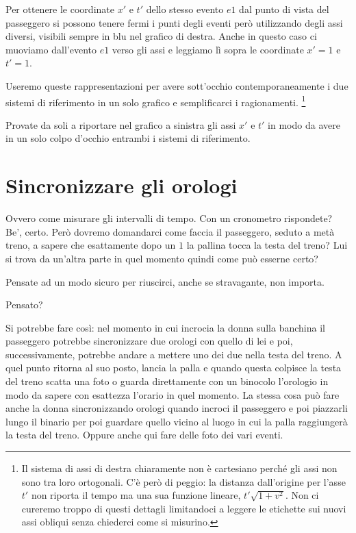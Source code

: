 Per ottenere le coordinate $x'$ e $t'$ dello stesso evento $e1$ dal punto di vista del passeggero si possono tenere fermi i punti degli eventi però utilizzando degli assi diversi, visibili sempre in blu nel grafico di destra. Anche in questo caso ci muoviamo dall'evento $e1$ verso gli assi e leggiamo lì sopra le coordinate $x'=1$ e $t'=1$.

Useremo queste rappresentazioni per avere sott'occhio contemporaneamente i due sistemi di riferimento in un solo grafico e semplificarci i ragionamenti. \footnote{Il sistema di assi di destra chiaramente non è cartesiano perché gli assi non sono tra loro ortogonali. C'è però di peggio: la distanza dall'origine per l'asse $t'$ non riporta il tempo ma una sua funzione lineare, $t'\sqrt{1+v^2}$. Non ci cureremo troppo di questi dettagli limitandoci a leggere le etichette sui nuovi assi obliqui senza chiederci come si misurino.}

Provate da soli a riportare nel grafico a sinistra gli assi $x'$ e $t'$ in modo da avere in un solo colpo d'occhio entrambi i sistemi di riferimento.

\section{Sincronizzare gli orologi}

Ovvero come misurare gli intervalli di tempo. Con un cronometro rispondete? Be’, certo. Però dovremo domandarci come faccia il passeggero, seduto a metà treno, a sapere che esattamente dopo un $1$ la pallina tocca la testa del treno? Lui si trova da un’altra parte in quel momento quindi come può esserne certo?

Pensate ad un modo sicuro per riuscirci, anche se stravagante, non importa.

Pensato?

Si potrebbe fare così: nel momento in cui incrocia la donna sulla banchina il passeggero potrebbe sincronizzare due orologi con quello di lei e poi, successivamente, potrebbe andare a mettere uno dei due nella testa del treno. A quel punto ritorna al suo posto, lancia la palla e quando questa colpisce la testa del treno scatta una foto o guarda direttamente con un binocolo l’orologio in modo da sapere con esattezza l’orario in quel momento. La stessa cosa può fare anche la donna sincronizzando orologi quando incroci il passeggero e poi piazzarli lungo il binario per poi guardare quello vicino al luogo in cui la palla raggiungerà la testa del treno. Oppure anche qui fare delle foto dei vari eventi. 

